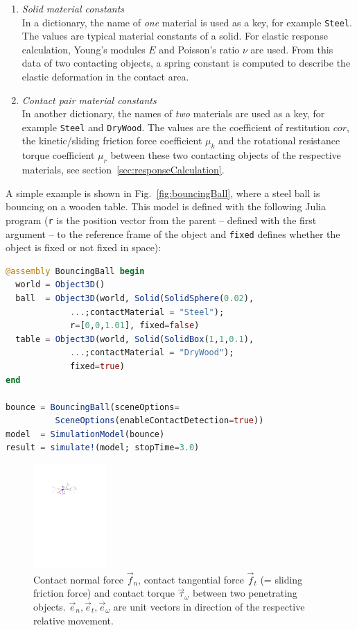 \begin{enumerate}
\item \emph{Solid material constants}\\
      In a dictionary, the name of \emph{one} material is used as a key, for example \texttt{Steel}. 
      The values are typical material constants of a solid. For elastic response calculation,
      Young's modules $E$ and Poisson's ratio $\nu$ are used. From this data of two contacting
      objects, a spring constant is computed to describe the elastic deformation in the contact area.

\item \emph{Contact pair material constants}\\
      In another dictionary, the names of \emph{two} materials are used as a key, for example \texttt{Steel} 
      and \texttt{DryWood}. The values are the coefficient of restitution $cor$, 
      the kinetic/sliding friction force coefficient $\mu_k$ and the 
      rotational resistance torque coefficient $\mu_r$ between these two contacting
      objects of the respective materials, see section~\ref{sec:responseCalculation}.
\end{enumerate}  

A simple example is shown in Fig.~\ref{fig:bouncingBall}, where a
steel ball is bouncing on a wooden table.
This model is defined with the following Julia program
(\texttt{r} is the position vector from the parent -- defined with the first
argument -- to the reference frame of the object and \texttt{fixed} defines
whether the object is fixed or not fixed in space):
%
\begin{lstlisting}[language = Julia]
@assembly BouncingBall begin
  world = Object3D()
  ball  = Object3D(world, Solid(SolidSphere(0.02),
		     ...;contactMaterial = "Steel");
		     r=[0,0,1.01], fixed=false)
  table = Object3D(world, Solid(SolidBox(1,1,0.1),
		     ...;contactMaterial = "DryWood"); 
		     fixed=true)
end

bounce = BouncingBall(sceneOptions=
          SceneOptions(enableContactDetection=true))
model  = SimulationModel(bounce)
result = simulate!(model; stopTime=3.0)
\end{lstlisting}

\begin{figure}[h]
	\centering
	\includegraphics[width=0.25\textwidth]{figures/forces.pdf}
	\caption{Contact normal force $\vec{f}_n$, contact tangential force $\vec{f}_t$ 
		(= sliding friction force) and contact torque $\vec{\tau}_{\omega}$
		between two penetrating objects. $\vec{e}_n, \vec{e}_t, \vec{e}_{\omega}$ are unit vectors
		in direction of the respective relative movement.}
	\label{fig:forces}
\end{figure}

